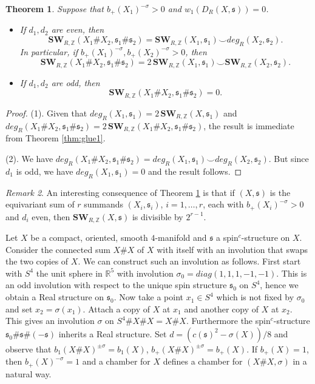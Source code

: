 \documentclass{amsart}
\newtheorem{theorem}{Theorem}[section]
\theoremstyle{definition}
\theoremstyle{remark}
\newtheorem{remark}[theorem]{Remark}
\numberwithin{equation}{section}
\begin{document}
\begin{theorem}\label{thm:glue2}
Suppose that $b_+(X_1)^{-\sigma} > 0$ and $w_1(D_R(X,\mathfrak{s})) = 0$.

\begin{itemize}
\item[(1)]{If $d_1,d_2$ are even, then
\[
\mathbf{SW}_{R,\mathbb{Z}}(X_1 \# X_2 , \mathfrak{s}_1 \# \mathfrak{s}_2) = \mathbf{SW}_{R,\mathbb{Z}}(X_1 , \mathfrak{s}_1) \smallsmile deg_R(X_2 , \mathfrak{s}_2).
\]
In particular, if $b_+(X_1)^{-\sigma}, b_+(X_2)^{-\sigma} > 0$, then
\[
\mathbf{SW}_{R,\mathbb{Z}}(X_1 \# X_2 , \mathfrak{s}_1 \# \mathfrak{s}_2) = 2 \, \mathbf{SW}_{R,\mathbb{Z}}(X_1 , \mathfrak{s}_1) \smallsmile \mathbf{SW}_{R,\mathbb{Z}}(X_2, \mathfrak{s}_2).
\]
}
\item[(2)]{If $d_1,d_2$ are odd, then
\[
\mathbf{SW}_{R,\mathbb{Z}}(X_1 \# X_2 , \mathfrak{s}_1 \# \mathfrak{s}_2) = 0.
\]
}
\end{itemize}
\end{theorem}
\begin{proof}
(1). Given that $deg_R(X_1 , \mathfrak{s}_1) = 2 \, \mathbf{SW}_{R,\mathbb{Z}}(X,\mathfrak{s}_1)$ and $deg_R(X_1 \# X_2 , \mathfrak{s}_1 \# \mathfrak{s}_2) = 2 \, \mathbf{SW}_{R,\mathbb{Z}}(X_1 \# X_2,\mathfrak{s}_1 \# \mathfrak{s}_2)$, the result is immediate from Theorem \ref{thm:glue1}.

(2). We have $deg_R(X_1 \# X_2 , \mathfrak{s}_1 \# \mathfrak{s}_2) = deg_R(X_1 ,\mathfrak{s}_1) \smallsmile deg_R(X_2 , \mathfrak{s}_2)$. But since $d_1$ is odd, we have $deg_R(X_1 ,\mathfrak{s}_1) = 0$ and the result follows.
\end{proof}

\begin{remark}
An interesting consequence of Theorem \ref{thm:glue2} is that if $(X,\mathfrak{s})$ is the equivariant sum of $r$ summands $(X_i , \mathfrak{s}_i)$, $i=1,\dots , r$, each with $b_+(X_i)^{-\sigma} > 0$ and $d_i$ even, then $\mathbf{SW}_{R,\mathbb{Z}}(X,\mathfrak{s})$ is divisible by $2^{r-1}$.
\end{remark}

Let $X$ be a compact, oriented, smooth $4$-manifold and $\mathfrak{s}$ a spin$^c$-structure on $X$. Consider the connected sum $X \# X$ of $X$ with itself with an involution that swaps the two copies of $X$. We can construct such an involution as follows. First start with $S^4$ the unit sphere in $\mathbb{R}^5$ with involution $\sigma_0 = diag(1,1,1,-1,-1)$. This is an odd involution with respect to the unique spin structure $\mathfrak{s}_0$ on $S^4$, hence we obtain a Real structure on $\mathfrak{s}_0$. Now take a point $x_1 \in S^4$ which is not fixed by $\sigma_0$ and set $x_2 = \sigma(x_1)$. Attach a copy of $X$ at $x_1$ and another copy of $X$ at $x_2$. This gives an involution $\sigma$ on $S^4 \# X \# X = X \# X$. Furthermore the spin$^c$-structure $\mathfrak{s}_0 \# \mathfrak{s} \# (-\mathfrak{s})$ inherits a Real structure. Set $d = (c(\mathfrak{s})^2 - \sigma(X))/8$ and observe that $b_1(X \# X)^{\pm \sigma} = b_1(X)$, $b_+(X \# X)^{\pm \sigma} = b_+(X)$. If $b_+(X) = 1$, then $b_+(X)^{-\sigma} = 1$ and a chamber for $X$ defines a chamber for $(X\# X , \sigma)$ in a natural way.
\end{document}
